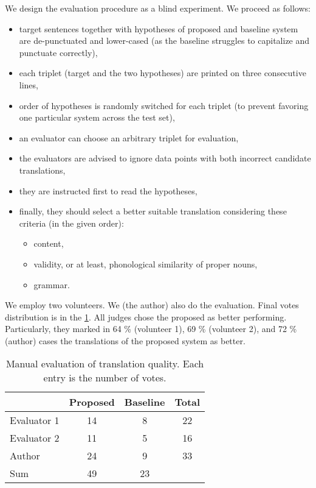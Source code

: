 We design the evaluation procedure as a blind experiment. We proceed as follows:

\begin{itemize}
	\item target sentences together with hypotheses of proposed and baseline system are de-punctuated and lower-cased (as the baseline struggles to capitalize and punctuate correctly),
	\item each triplet (target and the two hypotheses) are printed on three consecutive lines,
	\item order of hypotheses is randomly switched for each triplet (to prevent favoring one particular system across the test set),
	\item an evaluator can choose an arbitrary triplet for evaluation, 
	\item the evaluators are advised to ignore data points with both incorrect candidate translations,
	\item they are instructed first to read the hypotheses,
	\item finally, they should select a better suitable translation considering these criteria (in the given order):
	\begin{itemize}
		\item content,
		\item validity, or at least, phonological similarity of proper nouns,
		\item grammar.
	\end{itemize}
\end{itemize}

We employ two volunteers. We (the author) also do the evaluation. Final votes distribution is in the \cref{tab:cs_en_manual}. All judges chose the proposed as better performing. Particularly, they marked in 64 \% (volunteer 1), 69 \% (volunteer 2), and 72 \% (author) cases the translations of the proposed system as better.

\begin{table}[]
	\centering
	\begin{tabular}{l|cc|c}
		& Proposed & Baseline & Total \\ \hline
		Evaluator 1 & 14       & 8   & 22     \\ 
		Evaluator 2 & 11       & 5   & 16 \\
		Author      & 24       & 9   & 33     \\\hline
		Sum         & 49       & 23  &
	\end{tabular}
	\caption{Manual evaluation of translation quality. Each entry is the number of votes.}
	\label{tab:cs_en_manual}
\end{table}



